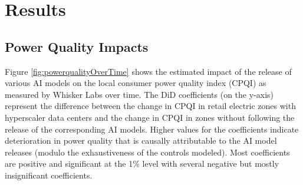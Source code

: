 \documentclass[sigconf,authordraft]{acmart}
\begin{document}



\section{Results}

\subsection{Power Quality Impacts}
Figure \ref{fig:powerqualityOverTime} shows the estimated impact of the release of various AI models on the local consumer power quality index (CPQI) as measured by Whisker Labs over time. The DiD coefficients (on the y-axis) represent the difference between the change in CPQI in retail electric zones with hyperscaler data centers and the change in CPQI in zones without following the release of the corresponding AI models. Higher values for the coefficients indicate deterioration in power quality that is causally attributable to the AI model releases (modulo the exhaustiveness of the controls modeled). Most coefficients are positive and significant at the 1\% level with several negative but mostly insignificant coefficients.
\end{document}
